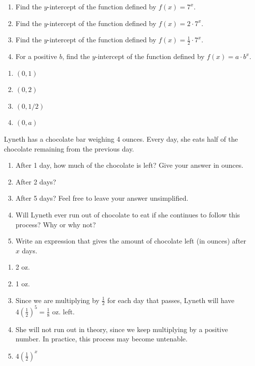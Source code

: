 \documentclass[noauthor]{ximera}
\begin{document}
\begin{problem}
\begin{enumerate}
    \item Find the \(y\)-intercept of the function defined by \(f\left(x\right)=7^x\).
    \item Find the \(y\)-intercept of the function defined by \(f\left(x\right)=2\cdot 7^x\).
    \item Find the \(y\)-intercept of the function defined by \(f\left(x\right)=\frac{1}{2}\cdot 7^x\).
    \item For a positive \(b\), find the \(y\)-intercept of the function defined by \(f\left(x\right)=a\cdot b^x\).
\end{enumerate}

\begin{explanation}
\begin{enumerate}
    \item \((0, 1)\)
    \item \((0, 2)\)
    \item \((0, 1/2)\)
    \item \((0, a)\)
\end{enumerate}
\end{explanation}
\end{problem}

\begin{problem}
Lyneth has a chocolate bar weighing 4 ounces. Every day, 
she eats half of the chocolate remaining from the previous day.

\begin{enumerate}
    \item After 1 day, how much of the chocolate is left? 
    Give your answer in ounces.
    \item After 2 days?
    \item After 5 days? Feel free to leave your answer unsimplified.
    \item Will Lyneth ever run out of chocolate to eat if she
    continues to follow this process? Why or why not?
    \item Write an expression that gives the amount of chocolate left
    (in ounces) after \(x\) days.
\end{enumerate}

\begin{explanation}
\begin{enumerate}
    \item 2 oz.
    \item 1 oz.
    \item Since we are multiplying by \(\frac{1}{2}\) for each day that passes, 
    Lyneth will have \(4\left(\frac{1}{2}\right)^5 = \frac{1}{8}\) oz. left.
    \item She will not run out in theory, since we keep multiplying by a positive number. In practice,
    this process may become untenable.
    \item \(4\left(\frac{1}{2}\right)^x\)
\end{enumerate}
\end{explanation}
\end{problem}
\end{document}
